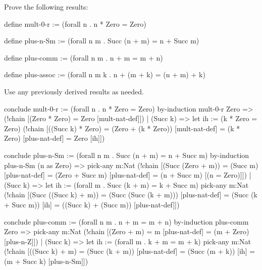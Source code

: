 \begin{exercise}[subtitle={\mbox{\rm{\em (SF Exercise 1.0.1, p. 28)}}}]
Prove the following results: 
\begin{tcAthena}
define mult-0-r :=   (forall n . n * Zero = Zero)

define plus-n-Sm :=  (forall n m . Succ (n + m) = n + Succ m)

define plus-comm :=  (forall n m . n + m = m + n)

define plus-assoc := (forall n m k . n + (m + k) = (n + m) + k)
\end{tcAthena}
Use any previously derived results as needed. 
\end{exercise}
\begin{solution}
\begin{tcAthena}
conclude mult-0-r := (forall n . n * Zero = Zero)
  by-induction mult-0-r {
    Zero     => (!chain [(Zero * Zero) = Zero  [mult-nat-def]])
  | (Succ k) => let {ih := (k * Zero = Zero)}
                  (!chain [((Succ k) * Zero)
                         = (Zero + (k * Zero)) [mult-nat-def]
                         = (k * Zero)          [plus-nat-def]
                         = Zero                [ih]])
  }

conclude plus-n-Sm := (forall n m . Succ (n + m) = n + Succ m)
  by-induction plus-n-Sm {
    (n as Zero) => pick-any m:Nat
                     (!chain [(Succ (Zero + m)) 
                            = (Succ m)         [plus-nat-def]
                            = (Zero + Succ m)  [plus-nat-def]
                            = (n + Succ m)     [(n = Zero)]])
  | (Succ k) => 
      let {ih := (forall m . Succ (k + m) = k + Succ m)}
        pick-any m:Nat
          (!chain [(Succ ((Succ k) + m))
                 = (Succ (Succ (k + m)))       [plus-nat-def] 
                 = (Succ (k + Succ m))         [ih]
                 = ((Succ k) + (Succ m))       [plus-nat-def]])
  }

conclude plus-comm := (forall n m . n + m = m + n)
  by-induction plus-comm {
    Zero => pick-any m:Nat
              (!chain [(Zero + m)
                     = m                       [plus-nat-def]
                     = (m + Zero)              [plus-n-Z]])
  | (Succ k) => let {ih := (forall m . k + m = m + k)}
                  pick-any m:Nat               
                    (!chain [((Succ k) + m)    
                           = (Succ (k + m))    [plus-nat-def]
                           = (Succ (m + k))    [ih]
                           = (m + Succ k)      [plus-n-Sm]])
  }
 


\end{tcAthena}
\end{solution}
